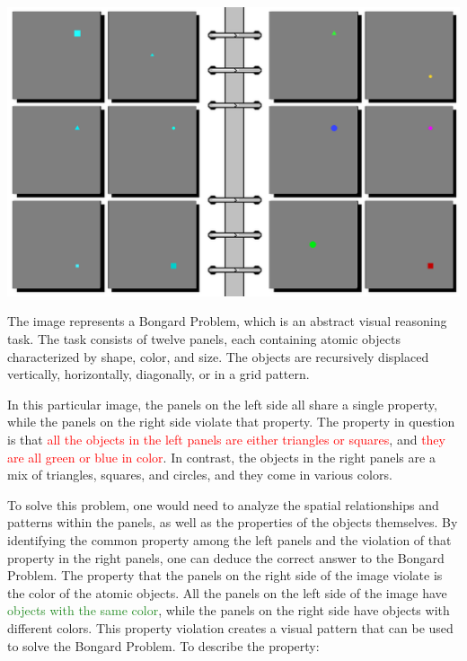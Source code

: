 \begin{tcolorbox}[breakable,enhanced jigsaw,opacityback=0,]
	\centering
	\includegraphics[width=.8\linewidth]{imgs/bongard/easy-6.png}\\
	\begin{dialogue}
		 The image represents a Bongard Problem, which is an abstract visual reasoning task. The task consists of twelve panels, each containing atomic objects characterized by shape, color, and size. The objects are recursively displaced vertically, horizontally, diagonally, or in a grid pattern.
		
		In this particular image, the panels on the left side all share a single property, while the panels on the right side violate that property. The property in question is that \textcolor{red}{all the objects in the left panels are either triangles or squares}, and \textcolor{red}{they are all green or blue in color}. In contrast, the objects in the right panels are a mix of triangles, squares, and circles, and they come in various colors.
		
		To solve this problem, one would need to analyze the spatial relationships and patterns within the panels, as well as the properties of the objects themselves. By identifying the common property among the left panels and the violation of that property in the right panels, one can deduce the correct answer to the Bongard Problem.
		\vspace{1em}
		 The property that the panels on the right side of the image violate is the color of the atomic objects. All the panels on the left side of the image have \textcolor{ForestGreen}{objects with the same color}, while the panels on the right side have objects with different colors. This property violation creates a visual pattern that can be used to solve the Bongard Problem.
		\vspace{1em}
		 To describe the property:
		

\end{dialogue}
\end{tcolorbox}
